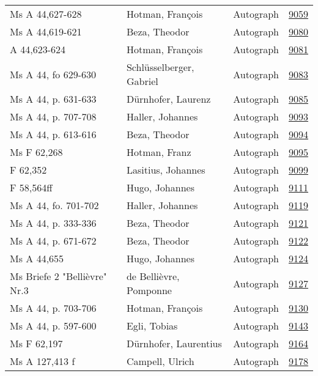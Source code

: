 \documentclass[10pt,a4paper,landscape]{report}
\begin{document}
\begin{longtable}{p{16cm}p{4cm}lr}
Ms A 44,627-628	&	Hotman, François	&	Autograph	&	\href{http://130.60.24.72/assignment/9059}{9059}\\
Ms A 44,619-621	&	Beza, Theodor	&	Autograph	&	\href{http://130.60.24.72/assignment/9080}{9080}\\
A 44,623-624	&	Hotman, François	&	Autograph	&	\href{http://130.60.24.72/assignment/9081}{9081}\\
Ms A 44, fo 629-630	&	Schlüsselberger, Gabriel	&	Autograph	&	\href{http://130.60.24.72/assignment/9083}{9083}\\
Ms A 44, p. 631-633	&	Dürnhofer, Laurenz	&	Autograph	&	\href{http://130.60.24.72/assignment/9085}{9085}\\
Ms A 44, p. 707-708	&	Haller, Johannes	&	Autograph	&	\href{http://130.60.24.72/assignment/9093}{9093}\\
Ms A 44, p. 613-616	&	Beza, Theodor	&	Autograph	&	\href{http://130.60.24.72/assignment/9094}{9094}\\
Ms F 62,268	&	Hotman, Franz	&	Autograph	&	\href{http://130.60.24.72/assignment/9095}{9095}\\
F 62,352	&	Lasitius, Johannes	&	Autograph	&	\href{http://130.60.24.72/assignment/9099}{9099}\\
F 58,564ff	&	Hugo, Johannes	&	Autograph	&	\href{http://130.60.24.72/assignment/9111}{9111}\\
Ms A 44, fo. 701-702	&	Haller, Johannes	&	Autograph	&	\href{http://130.60.24.72/assignment/9119}{9119}\\
Ms A 44, p. 333-336	&	Beza, Theodor	&	Autograph	&	\href{http://130.60.24.72/assignment/9121}{9121}\\
Ms A 44, p. 671-672	&	Beza, Theodor	&	Autograph	&	\href{http://130.60.24.72/assignment/9122}{9122}\\
Ms A 44,655	&	Hugo, Johannes	&	Autograph	&	\href{http://130.60.24.72/assignment/9124}{9124}\\
Ms Briefe 2 "Bellièvre" Nr.3	&	de Bellièvre, Pomponne	&	Autograph	&	\href{http://130.60.24.72/assignment/9127}{9127}\\
Ms A 44, p. 703-706	&	Hotman, François	&	Autograph	&	\href{http://130.60.24.72/assignment/9130}{9130}\\
Ms A 44, p. 597-600	&	Egli, Tobias	&	Autograph	&	\href{http://130.60.24.72/assignment/9143}{9143}\\
Ms F 62,197	&	Dürnhofer, Laurentius	&	Autograph	&	\href{http://130.60.24.72/assignment/9164}{9164}\\
Ms A 127,413 f	&	Campell, Ulrich	&	Autograph	&	\href{http://130.60.24.72/assignment/9178}{9178}\\

\end{longtable}
\end{document}
